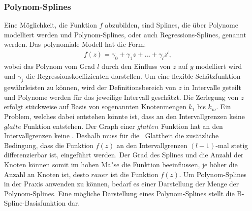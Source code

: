 \subsubsection{Polynom-Splines}
	Eine Möglichkeit, die Funktion $f$ abzubilden, sind Splines, die über Polynome modelliert werden und Polynom-Splines, oder auch Regressions-Splines, genannt werden. Das polynomiale Modell hat die Form: 
\begin{align}
f(z)=\gamma_{0}+\gamma_{1}z+...+\gamma_{l}z^l,
\end{align}
wobei das Polynom vom Grad $l$ durch den Einfluss von $z$ auf $y$ modelliert wird und $\gamma_{j}$ die Regressionskoeffizienten darstellen. Um eine flexible Schätzfunktion gewährleisten zu können, wird der Definitionsbereich von $z$ in Intervalle geteilt und Polynome werden für das jeweilige Intervall geschätzt. Die Zerlegung von $z$ erfolgt stückweise auf Basis von sogenannten Knotenmengen $k_{1}$ bis $k_{m}$.  Ein Problem, welches dabei entstehen könnte ist, dass an den Intervallgrenzen keine $glatte$ Funktion entstehen. Der Graph einer $glatten$ Funktion hat an den Intervallgrenzen keine . Deshalb muss für die \grqq ~Glattheit die zusätzliche Bedingung, dass die Funktion $f(z)$ an den Intervallgrenzen $(l-1)$-mal stetig differenzierbar ist, eingeführt werden. Der Grad des Splines und die Anzahl der Knoten können somit im hohen Ma"se die Funktion beeinflussen, je höher die Anzahl an Knoten ist, desto $rauer$ ist die Funktion $f(z)$. Um Polynom-Splines in der Praxis anwenden zu können, bedarf es einer Darstellung der Menge der Polynom-Splines. Eine mögliche Darstellung eines Polynom-Splines stellt die B-Spline-Basisfunktion dar.
